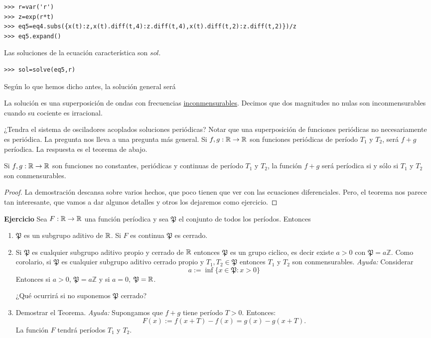 \begin{lstlisting}
>>> r=var('r')
>>> z=exp(r*t)
>>> eq5=eq4.subs({x(t):z,x(t).diff(t,4):z.diff(t,4),x(t).diff(t,2):z.diff(t,2)})/z
>>> eq5.expand()
\end{lstlisting}
Las soluciones de la ecuación característica son ${sol}$.
\begin{lstlisting}
>>> sol=solve(eq5,r)
\end{lstlisting}

Según lo que hemos dicho antes, la solución general será

La solución es una superposición de ondas con frecuencias \href{http://es.wikipedia.org/wiki/Conmensurabilidad_(matemática)}{inconmensurables}. Decimos que dos magnitudes no nulas son inconmensurables cuando su cociente es irracional.

¿Tendra el sistema de osciladores acoplados soluciones periódicas? Notar que una superposición de funciones periódicas no necesariamente es periódica.   La pregunta nos lleva a una pregunta más general. Si $f,g:\mathbb{R}\to\mathbb{R}$ son funciones periódicas de período $T_1$ y $T_2$, será $f+g$ períodica. La respuesta es el teorema de abajo.

\begin{teorema}  Si $f,g:\mathbb{R}\to\mathbb{R}$ son funciones no constantes, periódicas y continuas de período $T_1$ y $T_2$, la función $f+g$ será períodica si y sólo si $T_1$ y $T_2$ son conmensurables.
\end{teorema}

\begin{proof} La demostración descansa sobre varios hechos, que poco tienen que ver con las ecuaciones diferenciales. Pero, el teorema nos parece tan interesante, que vamos a dar algunos detalles y otros los dejaremos como ejercicio.
 \end{proof}


\noindent \textbf{Ejercicio} Sea $F:\mathbb{R}\to\mathbb{R}$ una función períodica y sea $\mathfrak{P}$ el conjunto de todos los períodos. Entonces
\begin{enumerate}
 \item $\mathfrak{P}$ es un subgrupo aditivo  de $\mathbb{R}$. Si $F$ es continua $\mathfrak{P}$ es cerrado.
 \item Si $\mathfrak{P}$ es cualquier subgrupo aditivo propio y cerrado de $\mathbb{R}$  entonces  $\mathfrak{P}$ es un grupo ciclico, es decir existe $a>0$ con $\mathfrak{P}=a\mathbb{Z}$.  Como corolario, si $\mathfrak{P}$ es cualquier subgrupo  aditivo cerrado propio  y $T_1,T_2\in \mathfrak{P}$ entonces $T_1$ y $T_2$ son conmensurables. \emph{Ayuda:} Considerar
\[a:=\inf\{x\in \mathfrak{P}:x>0\}\]
Entonces si $a>0$,  $\mathfrak{P}=a\mathbb{Z}$ y si $a=0$,  $\mathfrak{P}=\mathbb{R}$.

¿Qué ocurrirá si no suponemos $\mathfrak{P}$ cerrado?

 \item Demostrar el Teorema. \emph{Ayuda:} Supongamos  que $f+g$ tiene período $T>0$. Entonces:
\[F(x):=f(x+T)-f(x)=g(x)-g(x+T).\]
La función $F$ tendrá períodos $T_1$ y $T_2$.
 \end{enumerate}

